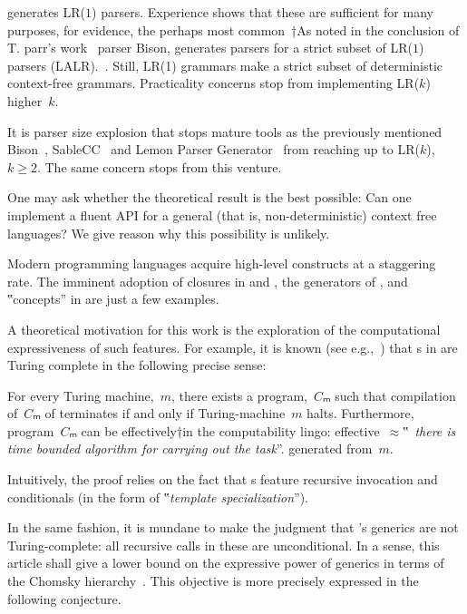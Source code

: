 \Self generates LR($1$) parsers. Experience shows that these are
  sufficient for many purposes, for evidence, the perhaps most common~†{As noted in the conclusion of T\@. parr's work~\cite{Parr:1995}} parser Bison,
  generates parsers for a strict subset of LR($1$) parsers (LALR).~\cite{Bison:manual}.
Still, LR(1) grammars make a strict subset of deterministic context-free grammars.
Practicality concerns stop \Self from implementing LR($k$) higher~$k$.

It is parser size explosion that stops mature tools as the previously mentioned Bison~\cite{Bison:manual},
  SableCC~ and Lemon Parser Generator~
  from reaching up to LR($k$),~$k≥2$.
The same concern stops \Self from this venture.

One may ask whether the theoretical result is the
  best possible:
Can one implement a fluent API for a general
  (that is, non-deterministic) context free languages?
We give reason why this possibility is unlikely.

Modern programming languages acquire high-level constructs
  at a staggering rate.
The imminent adoption of closures in \Java and \CC,
  the generators of \CSharp, and ‟concepts” in
  \CC are just a few examples.

A theoretical motivation for this work
  is the exploration of the computational
  expressiveness of such features.
For example, it is known (see e.g.,~\cite{Gutterman:2003}) that
  s in \CC are Turing complete in the following precise sense:

\begin{Theorem}
  \label{Theorem:Gutterman}
  For every Turing machine,~$m$, there exists a \CC program,~$Cₘ$ such that
    compilation of~$Cₘ$ of terminates if and only if
      Turing-machine~$m$ halts.
  Furthermore, program~$Cₘ$ can be effectively†{in the computability lingo:
    effective~$≈$‟~\emph{there is time
  bounded algorithm for carrying out the task}”.} generated from~$m$.
\end{Theorem}

Intuitively, the proof relies on the fact that s
  feature recursive invocation and conditionals (in the form of
  ‟\emph{template specialization}”).

In the same fashion, it is mundane to make the judgment that
  \Java's generics are not Turing-complete: all recursive calls
  in these are unconditional.
In a sense, this article shall give a lower bound on the
  expressive power of \Java generics in terms of the Chomsky hierarchy~\cite{Chomsky:1963}.
This objective is more precisely expressed in the following conjecture.

